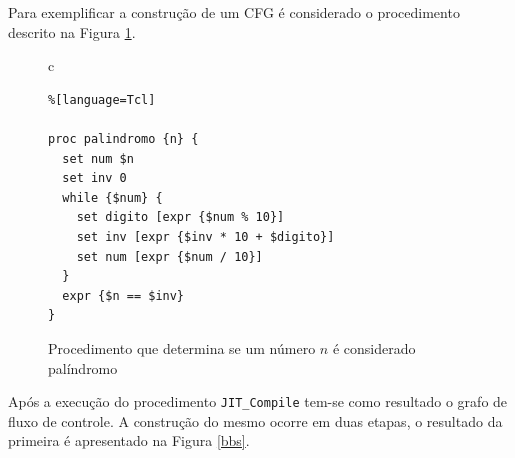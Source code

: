 Para exemplificar a construção de um CFG é considerado o procedimento
descrito na Figura \ref{fig:gray}.

\begin{figure}[h]
  \centering
  \begin{tabular}{c}
    \begin{lstlisting}%[language=Tcl]

proc palindromo {n} {
  set num $n
  set inv 0
  while {$num} {
    set digito [expr {$num % 10}]
    set inv [expr {$inv * 10 + $digito}]
    set num [expr {$num / 10}]
  }
  expr {$n == $inv}
}
    \end{lstlisting}
  \end{tabular}
  \caption{Procedimento que determina se um número $n$ é considerado palíndromo\label{fig:gray}}
\end{figure}

Após a execução do procedimento
\verb!JIT_Compile! tem-se como resultado o grafo de fluxo de
controle. A construção do mesmo ocorre em duas etapas, o resultado da
primeira é apresentado na Figura \ref{bbs}.

